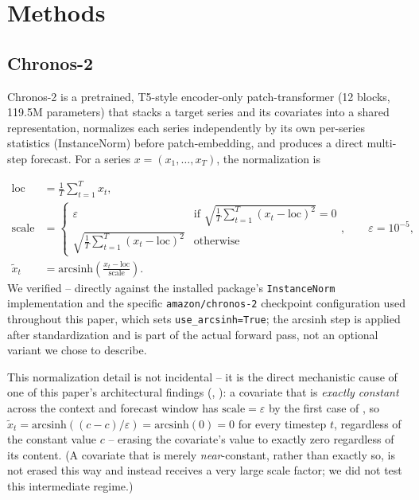 \documentclass[11pt]{article}
\begin{document}
\section{Methods}
\label{sec:methods}

\subsection{Chronos-2}
\label{sec:methods-chronos2}

Chronos-2 is a pretrained, T5-style encoder-only patch-transformer (12 blocks, 119.5M parameters)
that stacks a target series and its covariates into a shared representation, normalizes each
series independently by its own per-series statistics (InstanceNorm) before patch-embedding, and
produces a direct multi-step forecast. For a series $x = (x_1, \ldots, x_T)$, the normalization is

\begin{align}
  \mathrm{loc} &= \frac{1}{T}\sum_{t=1}^{T} x_t, \label{eq:in-loc} \\
  \mathrm{scale} &= \begin{cases} \varepsilon & \text{if } \sqrt{\frac{1}{T}\sum_{t=1}^{T}(x_t - \mathrm{loc})^2} = 0 \\[4pt] \sqrt{\frac{1}{T}\sum_{t=1}^{T}(x_t - \mathrm{loc})^2} & \text{otherwise} \end{cases}, \qquad \varepsilon = 10^{-5}, \label{eq:in-scale} \\
  \tilde{x}_t &= \mathrm{arcsinh}\!\left(\frac{x_t - \mathrm{loc}}{\mathrm{scale}}\right). \label{eq:in-scaled}
\end{align}
We verified -- directly against the installed package's
\texttt{InstanceNorm} implementation and the specific \texttt{amazon/chronos-2} checkpoint
configuration used throughout this paper, which sets \texttt{use\_arcsinh=True}; the arcsinh step
is applied after standardization and is part of the actual forward pass, not an optional variant we
chose to describe.

This normalization detail is not incidental -- it is the direct mechanistic cause of one of this
paper's architectural findings (, ): a
covariate that is \emph{exactly constant} across the context and forecast window has
$\mathrm{scale} = \varepsilon$ by the first case of , so
$\tilde{x}_t = \mathrm{arcsinh}((c - c)/\varepsilon) = \mathrm{arcsinh}(0) = 0$ for every timestep
$t$, regardless of the constant value $c$ -- erasing the covariate's value to exactly zero
regardless of its content. (A covariate that is merely \emph{near}-constant, rather than exactly
so, is not erased this way and instead receives a very large scale factor; we did not test this
intermediate regime.)
\end{document}
